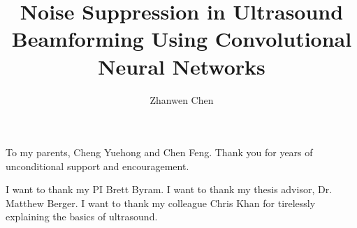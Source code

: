 \documentclass{ucbthesis}
\begin{document}

\title{Noise Suppression in Ultrasound Beamforming Using Convolutional Neural Networks}
\author{Zhanwen Chen}




\maketitle
\approvalpage
\copyrightpage



\begin{frontmatter}

\begin{dedication}
\null\vfil
\begin{center}
  To my parents, Cheng Yuehong and Chen Feng. Thank you for years of unconditional support and encouragement.
\end{center}
\vfil\null
\end{dedication}

\tableofcontents
\clearpage
\listoffigures
\clearpage
\listoftables

\begin{acknowledgements}
  I want to thank my PI Brett Byram.
  I want to thank my thesis advisor, Dr. Matthew Berger.
  I want to thank my colleague Chris Khan for tirelessly explaining the basics of ultrasound.
\end{acknowledgements}

\end{frontmatter}

\pagestyle{headings}




% 


\printbibliography
\end{document}
